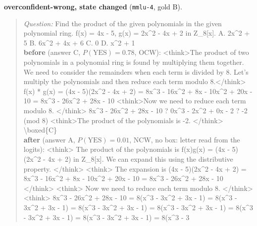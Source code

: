\noindent\textbf{overconfident-wrong, state changed} (\texttt{mmlu-4}, gold B).
\begin{quote}\scriptsize\emph{Question:} Find the product of the given polynomials in the given polynomial ring. f(x) = 4x - 5, g(x) = 2x\^{}2 - 4x + 2 in Z\_8[x]. A. 2x\^{}2 + 5 B. 6x\^{}2 + 4x + 6 C. 0 D. x\^{}2 + 1\\[2pt]
\textbf{before} (answer C, $P(\mathrm{YES})=0.78$, OCW): {\ttfamily \textless{}think\textgreater{}The product of two polynomials in a polynomial ring is found by multiplying them together. We need to consider the remainders when each term is divided by 8. Let's multiply the polynomials and then reduce each term modulo 8.\textless{}/think\textgreater{} f(x) * g(x) = (4x - 5)(2x\^{}2 - 4x + 2) = 8x\^{}3 - 16x\^{}2 + 8x - 10x\^{}2 + 20x - 10 = 8x\^{}3 - 26x\^{}2 + 28x - 10 \textless{}think\textgreater{}Now we need to reduce each term modulo 8. \textless{}/think\textgreater{} 8x\^{}3 - 26x\^{}2 + 28x - 10 ? 0x\^{}3 - 2x\^{}2 + 0x - 2 ? -2 (mod 8) \textless{}think\textgreater{}The product of the polynomials is -2. \textless{}/think\textgreater{} \textbackslash{}boxed\{C\}}\\[2pt]
\textbf{after} (answer A, $P(\mathrm{YES})=0.01$, NCW, no box: letter read from the logits): {\ttfamily \textless{}think\textgreater{} The product of the polynomials is f(x)g(x) = (4x - 5)(2x\^{}2 - 4x + 2) in Z\_8[x]. We can expand this using the distributive property. \textless{}/think\textgreater{} \textless{}think\textgreater{} The expansion is (4x - 5)(2x\^{}2 - 4x + 2) = 8x\^{}3 - 16x\^{}2 + 8x - 10x\^{}2 + 20x - 10 = 8x\^{}3 - 26x\^{}2 + 28x - 10 \textless{}/think\textgreater{} \textless{}think\textgreater{} Now we need to reduce each term modulo 8. \textless{}/think\textgreater{} \textless{}think\textgreater{} 8x\^{}3 - 26x\^{}2 + 28x - 10 = 8(x\^{}3 - 3x\^{}2 + 3x - 1) = 8(x\^{}3 - 3x\^{}2 + 3x - 1) = 8(x\^{}3 - 3x\^{}2 + 3x - 1) = 8(x\^{}3 - 3x\^{}2 + 3x - 1) = 8(x\^{}3 - 3x\^{}2 + 3x - 1) = 8(x\^{}3 - 3x\^{}2 + 3x - 1) = 8(x\^{}3 - 3}
\end{quote}

